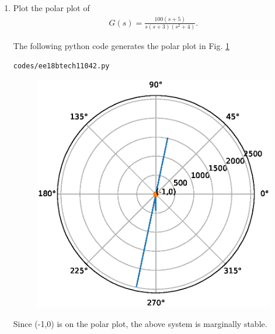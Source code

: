 \begin{enumerate}[label=\thesection.\arabic*.,ref=\thesection.\theenumi]
\item Plot the polar plot of 
\begin{align}
G(s) = \frac{100(s+5)}{s(s+3)(s^2+4)}. 
\end{align}

\solution
The following python code generates the polar plot in Fig.   \ref{fig:ee18btech11042_polarplot}

\begin{lstlisting}
codes/ee18btech11042.py
\end{lstlisting}

\begin{figure}[!ht]
\centering
  \includegraphics[width=\columnwidth]{./figs/ee18btech11042.eps}
\caption{}
  \label{fig:ee18btech11042_polarplot}
\end{figure}

Since (-1,0) is on the  polar plot, the  above system is  marginally stable.

\end{enumerate}


